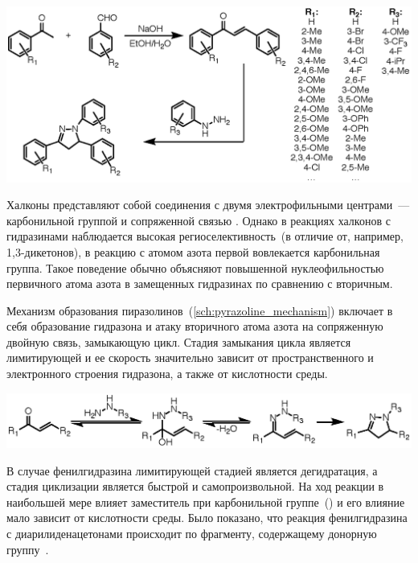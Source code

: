 \begin{scheme}[h!]
    \centering
    \includegraphics{sections/literature/img/pyrazolines_common.eps}
    \caption{}
\end{scheme}

Халконы представляют собой соединения с двумя электрофильными центрами~--- карбонильной группой и сопряженной связью .
Однако в реакциях халконов с гидразинами наблюдается высокая региоселективность~(в отличие от, например, 1,3-дикетонов), в реакцию с атомом азота первой вовлекается карбонильная группа.
Такое поведение обычно объясняют повышенной нуклеофильностью первичного атома азота в замещенных гидразинах по сравнению с вторичным.

Механизм образования пиразолинов~(\ref{sch:pyrazoline_mechanism}) включает в себя образование гидразона и атаку вторичного атома азота на сопряженную двойную связь, замыкающую цикл.
Стадия замыкания цикла является лимитирующей и ее скорость значительно зависит от пространственного и электронного строения гидразона, а также от кислотности среды.

\begin{scheme}[h!]
    \centering
    \includegraphics{sections/literature/img/pyrazoline_mechanism.eps}
    \caption{}
    \label{sch:pyrazoline_mechanism}
\end{scheme}

В случае фенилгидразина лимитирующей стадией является дегидратация, а стадия циклизации является быстрой и самопроизвольной.
На ход реакции в наибольшей мере влияет заместитель при карбонильной группе~() и его влияние мало зависит от кислотности среды.
Было показано, что реакция фенилгидразина с диарилиденацетонами происходит по фрагменту, содержащему донорную группу~\cite{Chebanov2008}.

